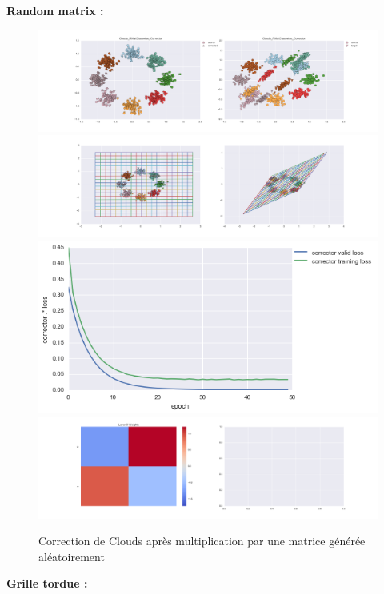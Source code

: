 {\Large \textbf{Random matrix :}}

\begin{figure}[H] %
\centering
\includegraphics[width=\linewidth]{fig/24-05-2016/clouds/Clouds_RMatClasswise_Corrector-DATA.png}
\includegraphics[width=\linewidth]{fig/24-05-2016/clouds/Clouds_RMatClasswise_Corrector-GridCheck.png}
\includegraphics[width=0.45\linewidth]{fig/24-05-2016/clouds/Clouds_RMatClasswise_Corrector-Learning_curve.png}
\includegraphics[width=\linewidth]{fig/24-05-2016/clouds/Clouds_RMatClasswise_Corrector-W.png}
\caption{Correction de Clouds après multiplication par une matrice générée aléatoirement}
\label{fig:recap-clouds-RMat-classwise}
\end{figure}

{\Large \textbf{Grille tordue :}}

